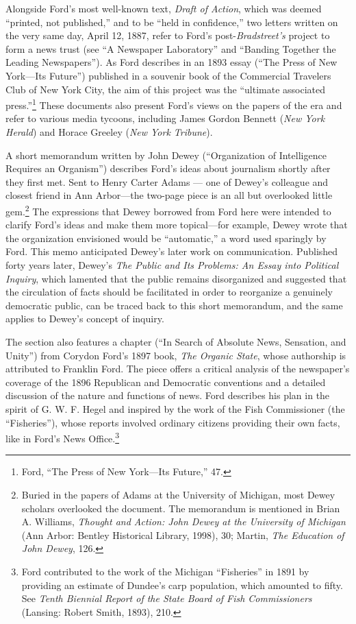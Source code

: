 \documentclass[twoside,symmetric,nobib,justified]{tufte-book}
\begin{document}
Alongside Ford's most well-known text, \emph{Draft of Action}, which was
deemed ``printed, not published,'' and to be ``held in confidence,'' two
letters written on the very same day, April 12, 1887, refer to Ford's
post-\emph{Bradstreet's} project to form a news trust (see ``A Newspaper
Laboratory'' and ``Banding Together the Leading Newspapers''). As Ford
describes in an 1893 essay (``The Press of New York---Its Future'')
published in a souvenir book of the Commercial Travelers Club of New
York City, the aim of this project was the ``ultimate associated
press.''\footnote{Ford, ``The Press of New York---Its Future,'' 47.}
These documents also present Ford's views on the papers of the era and
refer to various media tycoons, including James Gordon Bennett
(\emph{New York Herald}) and Horace Greeley (\emph{New York Tribune}).

A short memorandum written by John Dewey (``Organization of Intelligence
Requires an Organism'') describes Ford's ideas about journalism shortly
after they first met. Sent to Henry Carter Adams --- one of Dewey's
colleague and closest friend in Ann Arbor---the two-page piece is an all
but overlooked little gem.\footnote{Buried in the papers of Adams at the
  University of Michigan, most Dewey scholars overlooked the document.
  The memorandum is mentioned in Brian A. Williams, \emph{Thought and
  Action: John Dewey at the University of Michigan} (Ann Arbor: Bentley
  Historical Library, 1998), 30; Martin, \emph{The Education of}
  \emph{John Dewey}, 126.} The expressions that Dewey borrowed from Ford
here were intended to clarify Ford's ideas and make them more
topical---for example, Dewey wrote that the organization envisioned
would be ``automatic,'' a word used sparingly by Ford. This memo
anticipated Dewey's later work on communication. Published forty years
later, Dewey's \emph{The Public and Its Problems: An Essay into
Political Inquiry}, which lamented that the public remains disorganized
and suggested that the circulation of facts should be facilitated in
order to reorganize a genuinely democratic public, can be traced back to
this short memorandum, and the same applies to Dewey's concept of
inquiry.

The section also features a chapter (``In Search of Absolute News,
Sensation, and Unity'') from Corydon Ford's 1897 book, \emph{The Organic
State}, whose authorship is attributed to Franklin Ford. The piece
offers a critical analysis of the newspaper's coverage of the 1896
Republican and Democratic conventions and a detailed discussion of the
nature and functions of news. Ford describes his plan in the spirit of
G. W. F. Hegel and inspired by the work of the Fish Commissioner (the
``Fisheries''), whose reports involved ordinary citizens providing their
own facts, like in Ford's News Office.\footnote{Ford contributed to the
  work of the Michigan ``Fisheries'' in 1891 by providing an estimate of
  Dundee's carp population, which amounted to fifty. See \emph{Tenth
  Biennial Report of the State Board of Fish Commissioners} (Lansing:
  Robert Smith, 1893), 210.}
\end{document}
